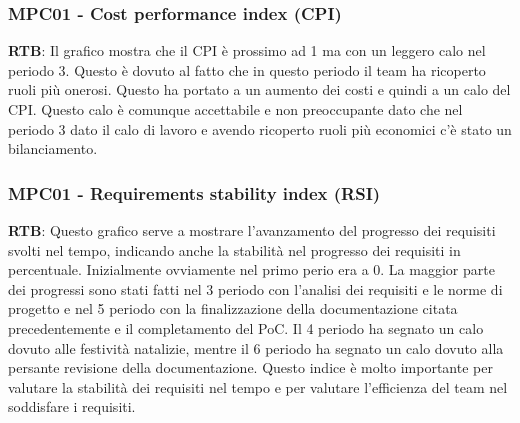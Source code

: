 \documentclass[10pt]{article}
\begin{document}
\begin{justify}
\subsubsection{MPC01 - Cost performance index (CPI)}
\textbf{RTB}: Il grafico mostra che il CPI è prossimo ad 1 ma con un leggero calo nel periodo 3. Questo è dovuto al fatto che in questo periodo il team ha ricoperto ruoli più onerosi. Questo ha portato a un aumento dei costi e quindi a un calo del CPI. Questo calo è comunque accettabile e non preoccupante dato che nel periodo 3 dato il calo di lavoro e avendo ricoperto ruoli più economici c'è stato un bilanciamento.

\subsubsection{MPC01 - Requirements stability index (RSI)}
\textbf{RTB}: Questo grafico serve a mostrare l'avanzamento del progresso dei requisiti svolti nel tempo, indicando anche la stabilità nel progresso dei requisiti in percentuale. Inizialmente ovviamente nel primo perio era a 0. La maggior parte dei progressi sono stati fatti nel 3 periodo con l'analisi dei requisiti e le norme di progetto e nel 5 periodo con la finalizzazione della documentazione citata precedentemente e il completamento del PoC. Il 4 periodo ha segnato un calo dovuto alle festività natalizie, mentre il 6 periodo ha segnato un calo dovuto alla persante revisione della documentazione. Questo indice è molto importante per valutare la stabilità dei requisiti nel tempo e per valutare l'efficienza del team nel soddisfare i requisiti.


\end{justify}
\end{document}
